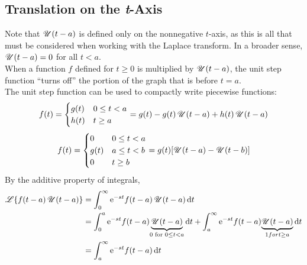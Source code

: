 \documentclass[./Differential Equations.tex]{subfiles}
\begin{document}
		\subsection{Translation on the \textit{t}-Axis}
				Note that \(\operatorname{\mathscr{U}}(t - a)\) is defined only on the nonnegative \(t\)-axis, as this is all that must be considered when working with the Laplace transform. In a broader sense, \(\operatorname{\mathscr{U}}(t - a) = 0\) for all \(t < a\). \\
				When a function \(f\) defined for \(t \ge 0\) is multiplied by \(\operatorname{\mathscr{U}}(t - a)\), the unit step function \enquote{turns off} the portion of the graph that is before \(t = a\). \\
				The unit step function can be used to compactly write piecewise functions:
					\[
						f(t) =
							\begin{cases}
								g(t) & 0 \le t < a \\
								h(t) & t \ge a	
							\end{cases}
							= g(t) - g(t)\operatorname{\mathscr{U}}(t - a) + h(t)\operatorname{\mathscr{U}}(t - a)
					\]
					\[
						f(t) = 
							\begin{cases}
							0 & 0 \le t < a \\
							g(t) & 	a \le t < b \\
							0 & t \ge b
							\end{cases}
							= g(t)[\operatorname{\mathscr{U}}(t - a) - \operatorname{\mathscr{U}}(t - b)]
					\]
				By the additive property of integrals,
					\begin{align*}
						\operatorname{\mathscr{L}}\{f(t - a)\operatorname{\mathscr{U}}(t - a)\} &= \int_0^\infty \text{e}^{-st}f(t - a)\operatorname{\mathscr{U}}(t - a)\dd{t} \\
							&= \int_0^a \text{e}^{-st}f(t - a)\underset{0 \text{ for } 0 \le t < a}{\underbrace{\operatorname{\mathscr{U}}(t - a)}}\dd{t} + \int_a^\infty \text{e}^{-st}f(t - a)\underset{1 for t \ge a}{\underbrace{\operatorname{\mathscr{U}}(t - a)}}\dd{t} \\
							&= \int_a^\infty \text{e}^{-st}f(t - a) \dd{t}
					\end{align*}
\end{document}
